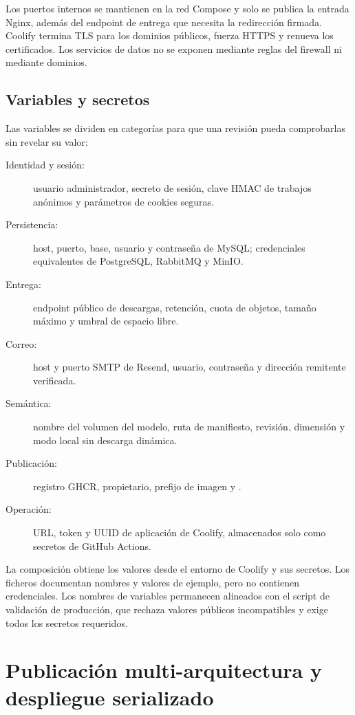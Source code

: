 Los puertos internos se mantienen en la red Compose y solo se publica la entrada Nginx, además del endpoint de entrega que necesita la redirección firmada. Coolify termina TLS para los dominios públicos, fuerza HTTPS y renueva los certificados. Los servicios de datos no se exponen mediante reglas del firewall ni mediante dominios.

\subsection{Variables y secretos}

Las variables se dividen en categorías para que una revisión pueda comprobarlas sin revelar su valor:

\begin{description}
  \item[Identidad y sesión:] usuario administrador, secreto de sesión, clave HMAC de trabajos anónimos y parámetros de cookies seguras.
  \item[Persistencia:] host, puerto, base, usuario y contraseña de MySQL; credenciales equivalentes de PostgreSQL, RabbitMQ y MinIO.
  \item[Entrega:] endpoint público de descargas, retención, cuota de objetos, tamaño máximo y umbral de espacio libre.
  \item[Correo:] host y puerto SMTP de Resend, usuario, contraseña y dirección remitente verificada.
  \item[Semántica:] nombre del volumen del modelo, ruta de manifiesto, revisión, dimensión y modo local sin descarga dinámica.
  \item[Publicación:] registro GHCR, propietario, prefijo de imagen y .
  \item[Operación:] URL, token y UUID de aplicación de Coolify, almacenados solo como secretos de GitHub Actions.
\end{description}

La composición obtiene los valores desde el entorno de Coolify y sus secretos. Los ficheros  documentan nombres y valores de ejemplo, pero no contienen credenciales. Los nombres de variables permanecen alineados con el script de validación de producción, que rechaza valores públicos incompatibles y exige todos los secretos requeridos.

\section{Publicación multi-arquitectura y despliegue serializado}

